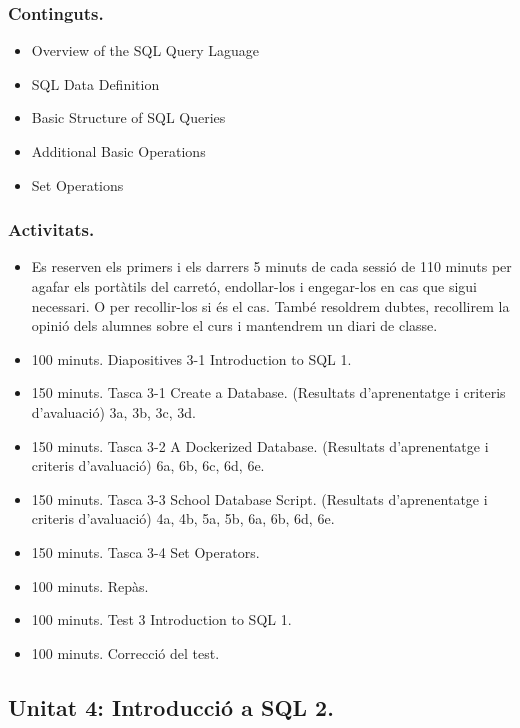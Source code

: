 \documentclass[catalan, a4paper, 12pt, titlepage]{article}
\begin{document}
  \subsubsection{Continguts.}
  \begin{itemize}
	  \item Overview of the SQL Query Laguage
	  \item SQL Data Definition
	  \item Basic Structure of SQL Queries
	  \item Additional Basic Operations
	  \item Set Operations
  \end{itemize}

  \subsubsection{Activitats.}

  \begin{itemize}
          \item Es reserven els primers i els darrers 5 minuts de cada sessió de 110 minuts per agafar els portàtils del carretó, endollar-los i engegar-los en cas que sigui necessari. O per recollir-los si és el cas. També resoldrem dubtes, recollirem la opinió dels alumnes sobre el curs i mantendrem un diari de classe.
	  \item 100 minuts. Diapositives 3-1 Introduction to SQL 1.
	  \item 150 minuts. Tasca 3-1 Create a Database. (\faGraduationCap Resultats d'aprenentatge i criteris d'avaluació) 3a, 3b, 3c, 3d.
	  \item 150 minuts. Tasca 3-2 A Dockerized Database. (\faGraduationCap Resultats d'aprenentatge i criteris d'avaluació) 6a, 6b, 6c, 6d, 6e.
	  \item 150 minuts. Tasca 3-3 School Database Script. (\faGraduationCap Resultats d'aprenentatge i criteris d'avaluació) 4a, 4b, 5a, 5b, 6a, 6b, 6d, 6e.
	  \item 150 minuts. Tasca 3-4 Set Operators.
	  \item 100 minuts. Repàs.
	  \item 100 minuts. Test 3 Introduction to SQL 1.
	  \item 100 minuts. Correcció del test.
  \end{itemize}

  \subsection{Unitat 4: Introducció a SQL 2.}
\end{document}
